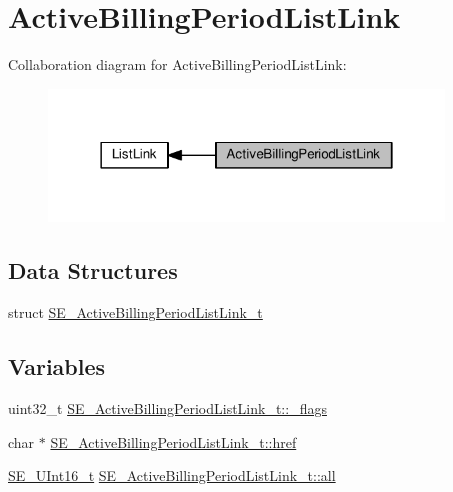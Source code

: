 \hypertarget{group__ActiveBillingPeriodListLink}{}\section{Active\+Billing\+Period\+List\+Link}
\label{group__ActiveBillingPeriodListLink}
Collaboration diagram for Active\+Billing\+Period\+List\+Link\+:\nopagebreak
\begin{figure}[H]
\begin{center}
\leavevmode
\includegraphics[width=298pt]{group__ActiveBillingPeriodListLink}
\end{center}
\end{figure}
\subsection*{Data Structures}
\begin{DoxyCompactItemize}
\item 
struct \hyperlink{structSE__ActiveBillingPeriodListLink__t}{S\+E\+\_\+\+Active\+Billing\+Period\+List\+Link\+\_\+t}
\end{DoxyCompactItemize}
\subsection*{Variables}
\begin{DoxyCompactItemize}
\item 
uint32\+\_\+t \hyperlink{group__ActiveBillingPeriodListLink_ga64ef5582fc32d3a39dfe9dd7240bbd71}{S\+E\+\_\+\+Active\+Billing\+Period\+List\+Link\+\_\+t\+::\+\_\+flags}
\item 
char $\ast$ \hyperlink{group__ActiveBillingPeriodListLink_gadfabe0fe21a2310a4503768001c896ca}{S\+E\+\_\+\+Active\+Billing\+Period\+List\+Link\+\_\+t\+::href}
\item 
\hyperlink{group__UInt16_gac68d541f189538bfd30cfaa712d20d29}{S\+E\+\_\+\+U\+Int16\+\_\+t} \hyperlink{group__ActiveBillingPeriodListLink_ga8bc21221a3c43c55939ec4201a003500}{S\+E\+\_\+\+Active\+Billing\+Period\+List\+Link\+\_\+t\+::all}
\end{DoxyCompactItemize}



